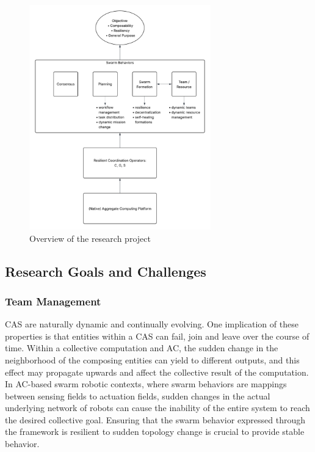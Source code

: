 \documentclass[12pt]{article}
\begin{document}
\begin{figure}
	\centering
	\includegraphics[width=0.7\textwidth]{figures/ResearchProject.png}
	\caption{Overview of the research project}
	 \label{fig:research-project}
\end{figure}

\subsection{Research Goals and Challenges}
\label{sec:challenges}

\subsubsection{Team Management}
CAS are naturally dynamic and continually evolving. One implication of these properties is that entities within a CAS can fail, join and leave over the course of time.
Within a collective computation and AC, the sudden change in the neighborhood of the composing entities can yield to different outputs, and this effect may propagate upwards and
affect the collective result of the computation. In AC-based swarm robotic contexts, where swarm behaviors are mappings between sensing fields to actuation fields, sudden changes
in the actual underlying network of robots can cause the inability of the entire system to reach the desired collective goal. Ensuring that the swarm behavior expressed through the
framework is resilient to sudden topology change is crucial to provide stable behavior. 
\end{document}
